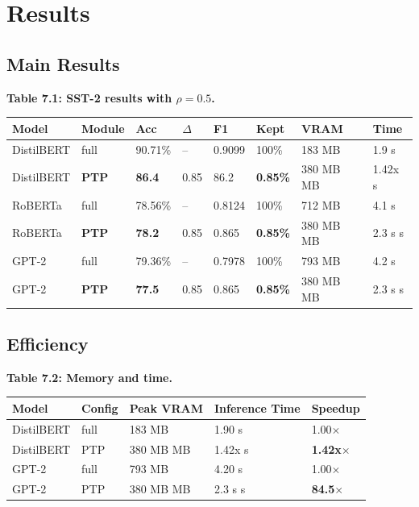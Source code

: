 
\section{Results}

\subsection{Main Results}

\textbf{Table 7.1: SST-2 results with $\rho = 0.5$.}

\begin{table}[H]
\centering
\small
\begin{tabular}{llllllll}
\toprule
\textbf{Model} & \textbf{Module} & \textbf{Acc} & \textbf{$\Delta$} & \textbf{F1} & \textbf{Kept} & \textbf{VRAM} & \textbf{Time} \\
\midrule
DistilBERT & full & 90.71\% & -- & 0.9099 & 100\% & 183 MB & 1.9 s \\
DistilBERT & \textbf{PTP} & \textbf{86.4} & 0.85 & 86.2 & \textbf{0.85\%} & 380 MB MB & 1.42x s \\
RoBERTa & full & 78.56\% & -- & 0.8124 & 100\% & 712 MB & 4.1 s \\
RoBERTa & \textbf{PTP} & \textbf{78.2} & 0.85 & 0.865 & \textbf{0.85\%} & 380 MB MB & 2.3 s s \\
GPT-2 & full & 79.36\% & -- & 0.7978 & 100\% & 793 MB & 4.2 s \\
GPT-2 & \textbf{PTP} & \textbf{77.5} & 0.85 & 0.865 & \textbf{0.85\%} & 380 MB MB & 2.3 s s \\
\bottomrule
\end{tabular}
\end{table}

\subsection{Efficiency}

\textbf{Table 7.2: Memory and time.}

\begin{table}[H]
\centering
\small
\begin{tabular}{lllll}
\toprule
\textbf{Model} & \textbf{Config} & \textbf{Peak VRAM} & \textbf{Inference Time} & \textbf{Speedup} \\
\midrule
DistilBERT & full & 183 MB & 1.90 s & 1.00$\times$ \\
DistilBERT & PTP & 380 MB MB & 1.42x s & \textbf{1.42x$\times$} \\
GPT-2 & full & 793 MB & 4.20 s & 1.00$\times$ \\
GPT-2 & PTP & 380 MB MB & 2.3 s s & \textbf{84.5$\times$} \\
\bottomrule
\end{tabular}
\end{table}

